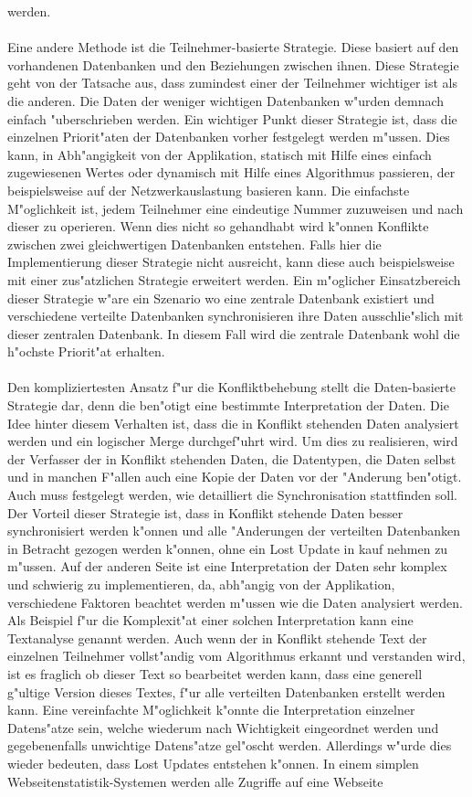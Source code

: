 \documentclass[a4paper,14pt]{scrreprt}
\begin{document}
werden.\\\\Eine andere Methode ist die Teilnehmer-basierte Strategie. Diese basiert auf den vorhandenen Datenbanken und den Beziehungen zwischen ihnen. Diese Strategie geht von der Tatsache aus, dass zumindest einer der Teilnehmer wichtiger ist als die anderen. Die Daten der weniger wichtigen Datenbanken w"urden demnach einfach "uberschrieben werden. Ein wichtiger Punkt dieser Strategie ist, dass die einzelnen Priorit"aten der Datenbanken vorher festgelegt werden m"ussen. Dies kann, in Abh"angigkeit von der Applikation, statisch mit Hilfe eines einfach zugewiesenen Wertes oder dynamisch mit Hilfe eines Algorithmus passieren, der beispielsweise auf der Netzwerkauslastung basieren kann. Die einfachste M"oglichkeit ist, jedem Teilnehmer eine eindeutige Nummer zuzuweisen und nach dieser zu operieren. Wenn dies nicht so gehandhabt wird k"onnen Konflikte zwischen zwei gleichwertigen Datenbanken entstehen. Falls hier die Implementierung dieser Strategie nicht ausreicht, kann diese auch beispielsweise mit einer zus"atzlichen Strategie erweitert werden. Ein m"oglicher Einsatzbereich dieser Strategie w"are ein Szenario wo eine zentrale Datenbank existiert und verschiedene verteilte Datenbanken synchronisieren ihre Daten ausschlie"slich mit dieser zentralen Datenbank. In diesem Fall wird die zentrale Datenbank wohl die h"ochste Priorit"at erhalten.\\\\Den kompliziertesten Ansatz f"ur die Konfliktbehebung stellt die Daten-basierte Strategie dar, denn die ben"otigt eine bestimmte Interpretation der Daten. Die Idee hinter diesem Verhalten ist, dass die in Konflikt stehenden Daten analysiert werden und ein logischer Merge durchgef"uhrt wird. Um dies zu realisieren, wird der Verfasser der in Konflikt stehenden Daten, die Datentypen, die Daten selbst und in manchen F"allen auch eine Kopie der Daten vor der "Anderung ben"otigt. Auch muss festgelegt werden, wie detailliert die Synchronisation stattfinden soll. Der Vorteil dieser Strategie ist, dass in Konflikt stehende Daten besser synchronisiert werden k"onnen und alle "Anderungen der verteilten Datenbanken in Betracht gezogen werden k"onnen, ohne ein Lost Update in kauf nehmen zu m"ussen. Auf der anderen Seite ist eine Interpretation der Daten sehr komplex und schwierig zu implementieren, da, abh"angig von der Applikation, verschiedene Faktoren beachtet werden m"ussen wie die Daten analysiert werden. Als Beispiel f"ur die Komplexit"at einer solchen Interpretation kann eine Textanalyse genannt werden. Auch wenn der in Konflikt stehende Text der einzelnen Teilnehmer vollst"andig vom Algorithmus erkannt und verstanden wird, ist es fraglich ob dieser Text so bearbeitet werden kann, dass eine generell g"ultige Version dieses Textes, f"ur alle verteilten Datenbanken erstellt werden kann. Eine vereinfachte M"oglichkeit k"onnte die Interpretation einzelner Datens"atze sein, welche wiederum nach Wichtigkeit eingeordnet werden und gegebenenfalls unwichtige Datens"atze gel"oscht werden. Allerdings w"urde dies wieder bedeuten, dass Lost Updates entstehen k"onnen. In einem simplen Webseitenstatistik-Systemen werden alle Zugriffe auf eine Webseite 
\end{document}
